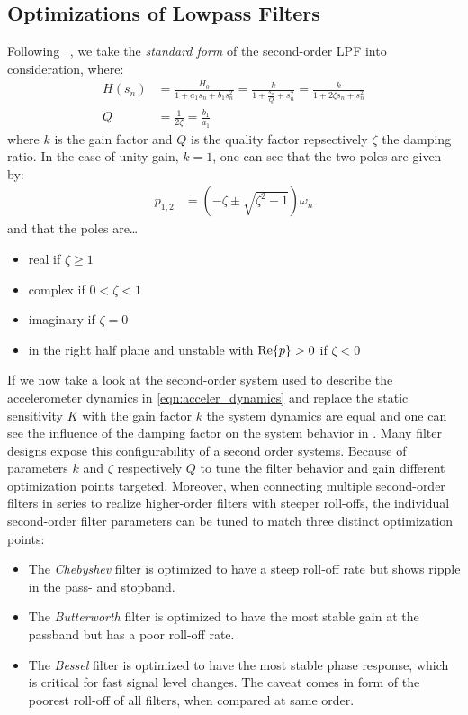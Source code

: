 \subsection{Optimizations of Lowpass Filters}
Following \citeauthor{Tietze2008EC}~\cite{Tietze2008EC}, we take the \emph{standard form} of the second-order \ac{LPF} into consideration, where:
\begin{align}
  H(s_n) &= \frac{H_0}{1+a_1s_n+b_1s_n^2} = \frac{k}{\displaystyle 1+\frac{s_n}{Q}+s_n^2} = \frac{k}{1+2\zeta s_n+s_n^2} \\
  Q &= \frac{1}{2\zeta} = \frac{b_1}{a_1}
\end{align}
where $k$ is the gain factor and $Q$ is the quality factor repsectively $\zeta$ the damping ratio. In the case of unity gain, $k=1$, one can see that the two poles are given by:
\begin{align}
  p_{1,2} &= (-\zeta \pm \sqrt{\zeta^2-1})\omega_n
\end{align}
and that the poles are\dots
\begin{itemize}
  \item real if $\zeta\geq 1$
  \item complex if $0<\zeta<1$
  \item imaginary if $\zeta=0$
  \item in the right half plane and unstable with $\mathrm{Re}\Bqty{p}>0$ if $\zeta<0$
\end{itemize}
If we now take a look at the second-order system used to describe the accelerometer dynamics in \eqref{eqn:acceler_dynamics} and replace the static sensitivity $K$ with the gain factor $k$ the system dynamics are equal and one can see the influence of the damping factor on the system behavior in .
Many filter designs expose this configurability of a second order systems. Because of parameters $k$ and $\zeta$ respectively $Q$ to tune the filter behavior and gain different optimization points targeted. Moreover, when connecting multiple second-order filters in series to realize higher-order filters with steeper roll-offs, the individual second-order filter parameters can be tuned to match three distinct optimization points:

\begin{itemize}
  \item The \emph{Chebyshev} filter is optimized to have a steep roll-off rate but shows ripple in the pass- and stopband.
  \item The \emph{Butterworth} filter is optimized to have the most stable gain at the passband but has a poor roll-off rate.
  \item The \emph{Bessel} filter is optimized to have the most stable phase response, which is critical for fast signal level changes. The caveat comes in form of the poorest roll-off of all filters, when compared at same order.
\end{itemize}

